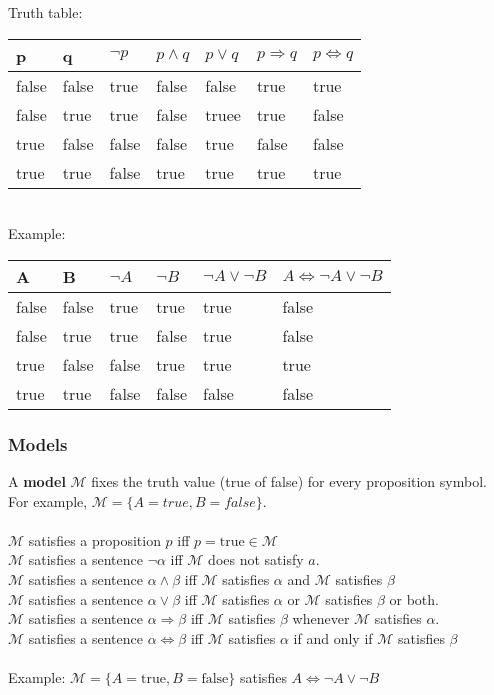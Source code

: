 Truth table:\\
\begin{tabular}{l l | l l l l l}
\hline
p     & q     & $\neg{p}$ & $p \land q$ & $p \lor q$ & $p \Rightarrow q$ & $p \Leftrightarrow q$\\ \hline
false & false & true      & false       & false      & true              & true\\ \hline
false & true  & true      & false       & truee      & true              & false\\ \hline
true  & false & false     & false       & true       & false             & false\\ \hline
true  & true  & false     & true        & true       & true              & true\\ \hline
\end{tabular}\\

Example:\\
\begin{tabular}{l l | l l l l}
\hline
A     & B     & $\neg A$ & $\neg B$ & $\neg A \lor \neg B$ & $A \Leftrightarrow \neg A \lor \neg B$\\ \hline
false & false & true     & true     & true                 & false\\ \hline
false & true  & true     & false    & true                 & false\\ \hline
true  & false & false    & true     & true                 & true\\ \hline
true  & true  & false    & false    & false                & false\\ \hline
\end{tabular}

\subsubsection{Models}
A \textbf{model} $\mathcal{M}$ fixes the truth value (true of false) for every
proposition symbol. For example, $\mathcal{M} = \{A=true, B=false\}$.\\\\
$\mathcal{M}$ satisfies a proposition $p$ iff $p = \text{true} \in \mathcal{M}$\\
$\mathcal{M}$ satisfies a sentence $\neg \alpha$ iff $\mathcal{M}$ does not satisfy
$a$.\\
$\mathcal{M}$ satisfies a sentence $\alpha \land \beta$ iff $\mathcal{M}$
satisfies $\alpha$ and $\mathcal{M}$ satisfies $\beta$\\
$\mathcal{M}$ satisfies a sentence $\alpha \lor \beta$ iff $\mathcal{M}$
satisfies $\alpha$ or $\mathcal{M}$ satisfies $\beta$ or both.\\
$\mathcal{M}$ satisfies a sentence $\alpha \Rightarrow \beta$ iff $\mathcal{M}$
satisfies $\beta$ whenever $\mathcal{M}$ satisfies $\alpha$.\\
$\mathcal{M}$ satisfies a sentence $\alpha \Leftrightarrow \beta$ iff
$\mathcal{M}$ satisfies $\alpha$ if and only if $\mathcal{M}$ satisfies $\beta$\\\\
Example: $\mathcal{M} = \{A = \text{true}, B = \text{false}\}$ satisfies $A
\Leftrightarrow \neg A \lor \neg B$

